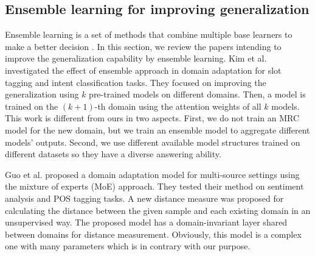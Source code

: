\documentclass[review]{elsarticle}
\begin{document}
\subsection{Ensemble learning for improving generalization}
Ensemble learning is a set of methods that combine multiple base learners to make a better decision \cite{sagi2018ensemble}.
In this section, we review the papers intending to improve the generalization capability by ensemble learning.
Kim et al. \cite{RN250} investigated the effect of ensemble approach in domain adaptation for slot tagging and intent classification tasks. They focused on improving the generalization using $k$ pre-trained models on different domains. Then, a model is trained on the $(k+1)$-th domain using the attention weights of all $k$ models. This work is different from ours in two aspects. First, we do not train an MRC model for the new domain, but we train an ensemble model to aggregate different models' outputs. Second, we use different available model structures trained on different datasets so they have a diverse answering ability. 

Guo et al. \cite{RN251} proposed a domain adaptation model for multi-source settings using the mixture of experts (MoE) approach. They tested their method on sentiment analysis and POS tagging tasks. A new distance measure was proposed for calculating the distance between the given sample and each existing domain in an unsupervised way. The proposed model has a domain-invariant layer shared between domains for distance measurement. Obviously, this model is a complex one with many parameters which is in contrary with our purpose.
\end{document}
